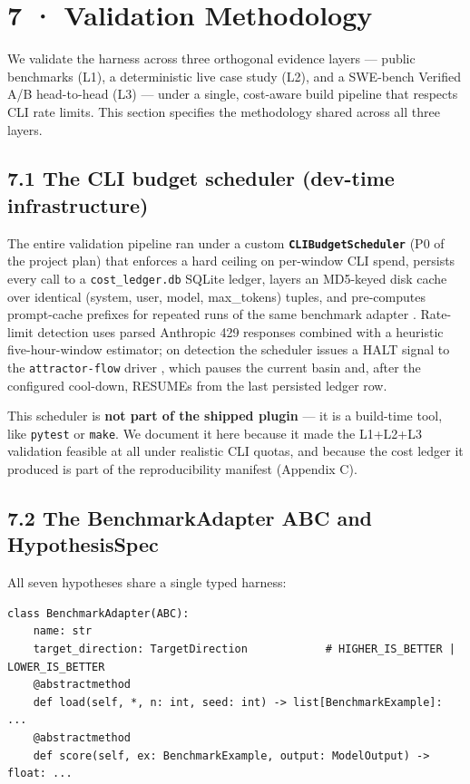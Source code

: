 \section{7 · Validation Methodology}\label{validation-methodology}

We validate the harness across three orthogonal evidence layers --- public benchmarks (L1), a deterministic live case study (L2), and a SWE-bench Verified A/B head-to-head (L3) --- under a single, cost-aware build pipeline that respects CLI rate limits. This section specifies the methodology shared across all three layers.

\subsection{7.1 The CLI budget scheduler (dev-time infrastructure)}\label{the-cli-budget-scheduler-dev-time-infrastructure}

The entire validation pipeline ran under a custom \textbf{\texttt{CLIBudgetScheduler}} (P0 of the project plan) that enforces a hard ceiling on per-window CLI spend, persists every call to a \texttt{cost\_ledger.db} SQLite ledger, layers an MD5-keyed disk cache over identical (system, user, model, max\_tokens) tuples, and pre-computes prompt-cache prefixes for repeated runs of the same benchmark adapter \citep{anthropic2024promptcaching}. Rate-limit detection uses parsed Anthropic 429 responses combined with a heuristic five-hour-window estimator; on detection the scheduler issues a HALT signal to the \texttt{attractor-flow} driver \citep{attractorflowplugin}, which pauses the current basin and, after the configured cool-down, RESUMEs from the last persisted ledger row.

This scheduler is \textbf{not part of the shipped plugin} --- it is a build-time tool, like \texttt{pytest} or \texttt{make}. We document it here because it made the L1+L2+L3 validation feasible at all under realistic CLI quotas, and because the cost ledger it produced is part of the reproducibility manifest (Appendix C).

\subsection{7.2 The BenchmarkAdapter ABC and HypothesisSpec}\label{the-benchmarkadapter-abc-and-hypothesisspec}

All seven hypotheses share a single typed harness:

\begin{verbatim}
class BenchmarkAdapter(ABC):
    name: str
    target_direction: TargetDirection            # HIGHER_IS_BETTER | LOWER_IS_BETTER
    @abstractmethod
    def load(self, *, n: int, seed: int) -> list[BenchmarkExample]: ...
    @abstractmethod
    def score(self, ex: BenchmarkExample, output: ModelOutput) -> float: ...
\end{verbatim}

